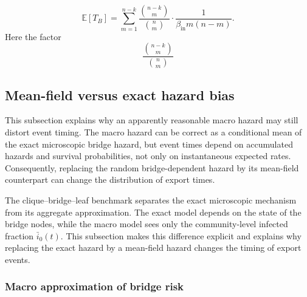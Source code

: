 \documentclass[a4paper,fleqn]{cas-sc}
\newcommand{\ReadStatusTwo}[5]{}
\begin{document}
\[
\mathbb{E}[T_B]
=
\sum_{m=1}^{n-k}
\frac{\binom{n-k}{m}}{\binom{n}{m}}
\cdot
\frac{1}{\beta_{\mathrm{in}} m(n-m)}.
\]
Here the factor
\[
\frac{\binom{n-k}{m}}{\binom{n}{m}}
\]

\subsection{Mean-field versus exact hazard bias}
\ReadStatusTwo{Mean-field versus exact hazard bias}{Yulian}{1}{Michael}{0}

This subsection explains why an apparently reasonable macro hazard may still distort event timing. 
The macro hazard can be correct as a conditional mean of the exact microscopic bridge hazard, but event times depend on accumulated hazards and survival probabilities, not only on instantaneous expected rates. 
Consequently, replacing the random bridge-dependent hazard by its mean-field counterpart can change the distribution of export times.

The clique--bridge--leaf benchmark separates the exact microscopic mechanism from its aggregate approximation. The exact model depends on the state of the bridge nodes, while the macro model sees only the community-level infected fraction \(\bar{i}_0(t)\). This subsection makes this difference explicit and explains why replacing the exact hazard by a mean-field hazard changes the timing of export events.

\subsubsection{Macro approximation of bridge risk}
\ReadStatusTwo{Macro approximation of bridge risk}{Yulian}{1}{Michael}{0}
\end{document}
